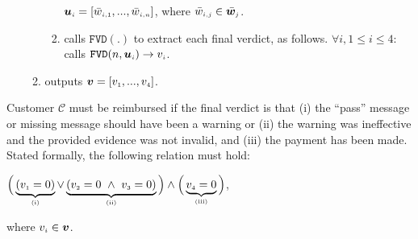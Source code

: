 \begin{enumerate}
\begin{enumerate}
\begin{enumerate}
  $\bm u_{\scriptscriptstyle i}=[\bar{w}_{\scriptscriptstyle i,1},...,\bar{w}_{\scriptscriptstyle i,n}]$, where $\bar{w}_{\scriptscriptstyle i,j}\in \bar {\bm w}_{\scriptscriptstyle j}$. 
%
\item calls $\mathtt{FVD}(.)$ to extract each final verdict, as follows. $\forall i, 1\leq i \leq 4:$ calls $\mathtt{FVD}(n,  {\bm u}_{\scriptscriptstyle i})\rightarrow  v_{\scriptscriptstyle i}$. 




%
%
%
%
\end{enumerate}
%

\item outputs $\bm v=[v_{\scriptscriptstyle 1},...,v_{\scriptscriptstyle 4}]$.

\end{enumerate}
\end{enumerate}
Customer $\mathcal{C}$ must be reimbursed if the final verdict is that (i)  the ``pass'' message or  missing message should have been a warning or (ii)  the warning was ineffective and the provided evidence was not invalid, and (iii) the payment has been made. Stated formally, the following relation must hold: 
%
\begin{center}
$\Big( \underbrace{(v_{\scriptscriptstyle 1}=0)}_{\scriptscriptstyle (\text{i})}\vee  \underbrace{(v_{\scriptscriptstyle 2}=0\ \wedge\ v_{\scriptscriptstyle 3}=0)}_{\scriptscriptstyle (\text {ii})}\Big)\wedge\Big(\underbrace{v_{\scriptscriptstyle 4}=0}_{\scriptscriptstyle (\text{iii})}\Big)$,
\end{center}
%
 where $v_{\scriptscriptstyle i}\in \bm v$.
%
